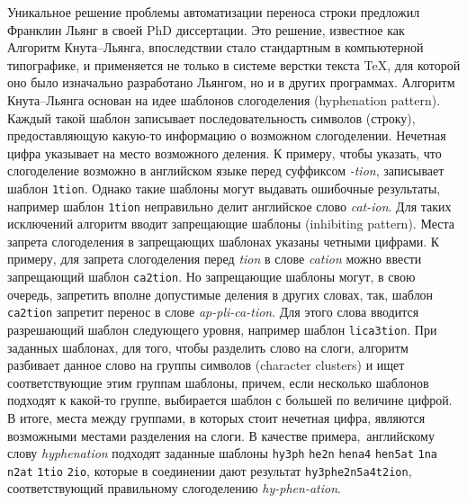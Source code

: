 \documentclass[12pt,a4paper,oneside]{extarticle}
\begin{document}
Уникальное решение проблемы автоматизации переноса строки предложил Франклин Льянг в своей PhD диссертации\autocite[][]{liang1983}. Это решение, известное как Алгоритм Кнута--Льянга, впоследствии стало стандартным в компьютерной типографике, и применяется не только в системе верстки текста \TeX{}, для которой оно было изначально разработано Льянгом, но и в других программах\autocite[Первое описание системы \TeX{} см. ][]{knuth1979}. Алгоритм Кнута--Льянга основан на идее шаблонов слогоделения (\textenglish{hyphenation pattern}). Каждый такой шаблон записывает последовательность символов (строку), предоставляющую какую-то информацию о возможном слогоделении. Нечетная цифра указывает на место возможного деления. К примеру, чтобы указать, что слогоделение возможно в английском языке перед суффиксом \emph{-tion}, записывает шаблон \verb+1tion+. Однако такие шаблоны могут выдавать ошибочные результаты, например шаблон \verb+1tion+ неправильно делит английское слово \emph{cat-ion}. Для таких исключений алгоритм вводит запрещающие шаблоны (\textenglish{inhibiting pattern}). Места запрета слогоделения в запрещающих шаблонах указаны четными цифрами. К примеру, для запрета слогоделения перед \emph{tion} в слове \emph{cation} можно ввести запрещающий шаблон \verb+ca2tion+. Но запрещающие шаблоны могут, в свою очередь, запретить вполне допустимые деления в других словах, так, шаблон \verb+ca2tion+ запретит перенос в слове \emph{ap-pli-ca-tion}. Для этого слова вводится разрешающий шаблон следующего уровня, например шаблон \verb+lica3tion+. При заданных шаблонах, для того, чтобы разделить слово на слоги, алгоритм разбивает данное слово на группы символов (\textenglish{character clusters}) и ищет соответствующие этим группам шаблоны, причем, если несколько шаблонов подходят к какой-то группе, выбирается шаблон с большей по величине цифрой. В итоге, места между группами, в которых стоит нечетная цифра, являются возможными местами разделения на слоги. В качестве примера, английскому слову \emph{hyphenation} подходят заданные шаблоны \verb+hy3ph+ \verb+he2n+ \verb+hena4+ \verb+hen5at+ \verb+1na+ \verb+n2at+ \verb+1tio+ \verb+2io+, которые в соединении дают результат \verb+hy3phe2n5a4t2ion+, соответствующий правильному слогоделению \emph{hy-phen-ation}\autocite[См. подробнее ][pp.~5--6, 35--40.]{liang1983}.
\end{document}
